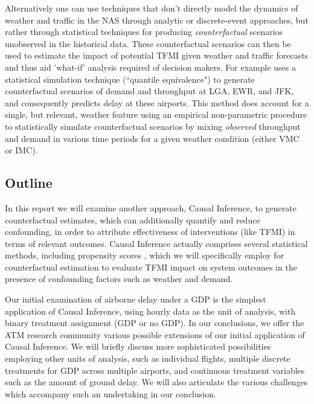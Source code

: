 \documentclass[conference]{IEEEtran}
\begin{document}

Alternatively one can use techniques that don't directly model the dynamics of weather and traffic in the NAS through analytic or discrete-event approaches, but rather through statistical techniques for producing \emph{counterfactual} scenarios unobserved in the historical data.  These counterfactual scenarios can then be used to estimate the impact of potential TFMI given weather and traffic forecasts and thus aid 'what-if' analysis required of decision makers.  For example \cite{kim2013} uses a statistical simulation technique (``quantile equivalence") to generate counterfactual scenarios of demand and throughput at LGA, EWR, and JFK, and consequently predicts delay at these airports.  This method does account for a single, but relevant, weather feature using an empirical non-parametric procedure to statistically simulate counterfactual scenarios by mixing \emph{observed} throughput and demand in various time periods for a given weather condition (either VMC or IMC).  


\subsection{Outline}
In this report we will examine another approach, Causal Inference, to generate counterfactual estimates, which can additionally quantify and reduce confounding, in order to attribute effectiveness of interventions (like TFMI) in terms of relevant outcomes. Causal Inference actually comprises several statistical methods, including propensity scores \cite{austin2011tutorial}, which we will specifically employ for counterfactual estimation to evaluate TFMI impact on system outcomes in the presence of confounding factors such as weather and demand.

Our initial examination of airborne delay under a GDP is the simplest application of Causal Inference, using hourly data as the unit of analysis, with binary treatment assignment (GDP or no GDP).  In our conclusions, we offer the ATM research community various possible extensions of our initial application of Causal Inference. We will briefly discuss more sophisticated possibilities employing other units of analysis, such as individual flights, multiple discrete treatments for GDP across multiple airports, and continuous treatment variables such as the amount of ground delay.  We will also articulate the various challenges which accompany such an undertaking in our conclusion.  
\end{document}

